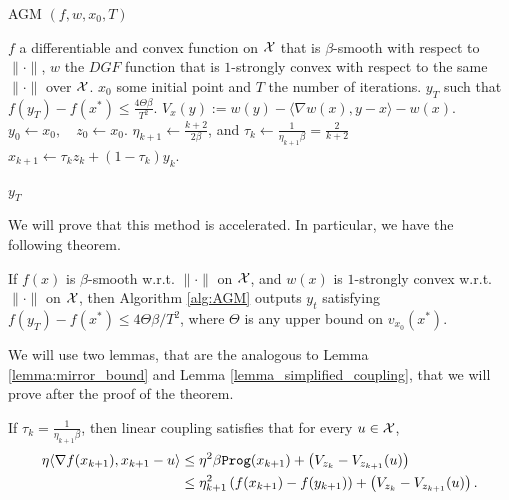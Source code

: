 \begin{algorithm}[H]\label{alg:AGM}
\scriptsize
\caption{AGM $(f, w, x_0, T)$}
   \label{alg:AGM}
   \begin{algorithmic}[1]
   \REQUIRE $f$ a differentiable and convex function on $\mathcal{X}$ that is $\beta$-smooth with respect to $\|\cdot\|$, $w$ the $DGF$ function that is $1$-strongly convex with respect to the same $\|\cdot\|$ over $\mathcal{X}$. $x_0$ some initial point and $T$ the number of iterations.
   \ENSURE $y_T$ such that $f(y_T) -f(x^\ast) \leq \frac{4\Theta \beta}{T^2}$.
   \STATE $V_x(y) := w(y) - \langle \nabla w(x), y-x\rangle - w(x).$
   \STATE $y_0 \gets x_0, \quad z_0 \gets x_0$.
       \STATE $\eta_{k+1} \gets \frac{k+2}{2\beta}$, and $\tau_k \gets \frac{1}{\eta_{k+1}\beta} = \frac{2}{k+2}$
       \STATE $x_{k+1} \gets \tau_k z_k + (1-\tau_k)y_k$.

   \ENDFOR
    $y_T$
\end{algorithmic}
\end{algorithm}

We will prove that this method is accelerated. In particular, we have the following theorem.

\begin{theorem}\label{thm:linear_coupling}
    If $f(x)$ is $\beta$-smooth w.r.t. $\|\cdot\|$ on $\mathcal{X}$, and $w(x)$ is $1$-strongly convex w.r.t. $\|\cdot\|$ on $\mathcal{X}$, then Algorithm \ref{alg:AGM} outputs $y_t$ satisfying $f(y_T) - f(x^\ast) \leq 4 \Theta \beta /T^2$, where $\Theta$ is any upper bound on $v_{x_0}(x^\ast)$.
\end{theorem}

We will use two lemmas, that are the analogous to Lemma \ref{lemma:mirror_bound} and Lemma \ref{lemma_simplified_coupling}, that we will prove after the proof of the theorem.

\begin{lemma}\label{lemma:mirror_bound_general}
    If $\tau_k = \frac{1}{\eta_{k+1}\beta}$, then linear coupling satisfies that for every $u \in \mathcal{X}$,
    \begin{align*}\label{actual_regret_linear_coupling}
        \begin{aligned}
            \eta \langle \nabla f(x_{k+1}), x_{k+1} - u \rangle &\leq \eta^2\beta {\tt{Prog}}(x_{k+1}) + \left( V_{z_k} - V_{z_{k+1}}(u)\right) \\
                                                                &\leq \eta_{k+1}^2 \left( f(x_{k+1}) - f(y_{k+1})\right) + \left( V_{z_k} - V_{z_{k+1}}(u)\right).
        \end{aligned}
    \end{align*}
\end{lemma}

